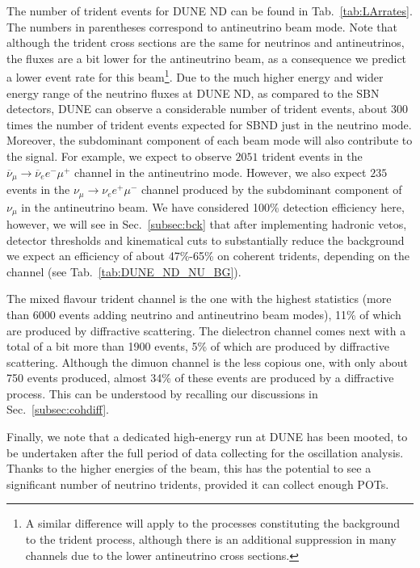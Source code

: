 The number of trident events for DUNE ND can be found in Tab.~\ref{tab:LArrates}. 
The numbers in parentheses correspond to antineutrino beam mode.
Note that although the trident cross sections are the same 
for neutrinos and antineutrinos, the fluxes are a bit lower for the antineutrino beam, as a consequence we predict a lower event rate for this beam\footnote{A similar difference will apply to the processes constituting the background to the trident process, although there is an additional suppression in many channels due to the lower antineutrino cross sections.}.
%
Due to the much higher energy and wider energy range of the neutrino fluxes at DUNE ND, as compared to the SBN detectors, DUNE can observe a considerable number of trident events, about 300 times the number of trident events expected for SBND just in the neutrino mode. Moreover, the subdominant component of 
each beam mode will also contribute to the signal. For example, we expect to observe $2051$ trident events in the $\overline{\nu}_\mu\to\overline{\nu}_e e^- \mu^+$ channel in the antineutrino mode. However, we also expect 
$235$ events in the $\nu_\mu\to\nu_e e^+ \mu^-$ channel produced by 
the subdominant component of $\nu_\mu$ in the antineutrino beam.
%
We have considered 100\% detection efficiency here, however, we will see in Sec.~\ref{subsec:bck} that after implementing hadronic vetos, detector thresholds and kinematical cuts to substantially reduce the background we expect an efficiency of about 47\%-65\% on coherent tridents, depending on the channel (see Tab.~\ref{tab:DUNE_ND_NU_BG}).

The mixed flavour trident channel is the one with the highest statistics (more than 6000 events adding 
neutrino and antineutrino beam modes), 11\% of which are produced by diffractive scattering. The dielectron channel comes next with a total of a bit more than 1900 events, 5\%  of which are produced by diffractive scattering. Although the  dimuon channel is the less copious one, with only about 
750 events produced, almost 34\% of these events are produced by a diffractive process.
This can be understood by recalling our discussions in Sec.~\ref{subsec:cohdiff}.

Finally, we note that a dedicated high-energy run at DUNE has been mooted, to be undertaken after the full period of data collecting for the oscillation analysis. Thanks to the higher energies of the beam, this has the potential to see a significant number of neutrino tridents, provided it can collect enough POTs.  

